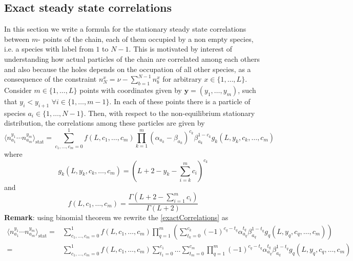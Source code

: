 \documentclass[10pt]{article}
\numberwithin{equation}{section}
\numberwithin{equation}{subsection}
\begin{document}
\subsection{Exact steady state correlations}\label{correlation-section}
In this section we write a formula for the stationary steady state correlations between $m$- points of the chain, each of them occupied by a non empty species, i.e. a species with label from $1$ to $N-1$. This is motivated by interest of understanding how actual particles of the chain are correlated among each others and also because the holes depends on the occupation of all other species, as a consequence of the constraint $n_{N}^{x}=\nu-\sum_{b=1}^{N-1}n_{b}^{x}$ for arbitrary $x\in \{1,\ldots,L\}$. Consider $m\in \{1,\ldots,L\}$ points with coordinates given by $\bm{y}=(y_{1},\ldots,y_{m})$, such that $y_{i}<y_{i+1}$ $\forall i\in \{1,\ldots,m-1\}$. In each of these points there is a particle of species $a_{i}\in \{1,\ldots,N-1\}$. Then, with respect to the non-equilibrium stationary distribution, the correlations among these particles are given by
\begin{equation}\label{exactCorrelations}
		\langle n^{y_{1}}_{a_{1}}\cdots n^{y_{m}}_{a_{m}}\rangle_{\text{stat}}=\sum_{c_{1},\ldots,c_{m}=0}^{1}
			f(L,c_{1},\ldots,c_{m})\prod_{k=1}^{m}(\alpha_{a_{k}}-\beta_{a_{k}})^{c_{k}}\beta_{a_{k}}^{1-c_{k}}g_{k}(L,y_{k},c_{k},\ldots,c_{m})
	\end{equation}
	where 
	\begin{equation}\label{powerCoeffSpecies}
		g_{k}(L,y_{k},c_{k},\ldots,c_{m})=\left(L+2-y_{k}-\sum_{i=k}^{m}c_{i}\right)^{c_{k}}
	\end{equation}
	and 
	\begin{equation}\label{powerCoeffNOspec}
		f(L,c_{1},\ldots,c_{m})=\frac{\Gamma(L+2-\sum_{i=1}^{m}c_{i})}{\Gamma(L+2)}
	\end{equation}
\textbf{Remark}: using binomial theorem we rewrite the \eqref{exactCorrelations} as 
\begin{equation}
\begin{split}
\langle n^{y_{1}}_{a_{1}}\cdots n^{y_{m}}_{a_{m}}\rangle_{\text{stat}}=&
\sum_{c_{1},\ldots,c_{m}=0}^{1}
f(L,c_{1},\ldots,c_{m})\prod_{q=1}^{m}\left(\sum_{t_{k}=0}^{c_{k}}(-1)^{c_{q}-t_{q}}\alpha_{a_{q}}^{t_{q}}\beta_{a_{q}}^{1-t_{q}}g_{q}(L,y_{q},c_{q},\ldots,c_{m})\right)\\
=&\sum_{c_{1},\ldots,c_{m}=0}^{1}
f(L,c_{1},\ldots,c_{m})\sum_{t_{1}=0}^{c_{1}}\ldots\sum_{t_{m}=0}^{c_{m}}\prod_{q=1}^{m}(-1)^{c_{q}-t_{q}}\alpha_{a_{q}}^{t_{q}}\beta_{a_{q}}^{1-t_{q}}g_{q}(L,y_{q},c_{q},\ldots,c_{m})
\end{split}
\end{equation}
\end{document}
